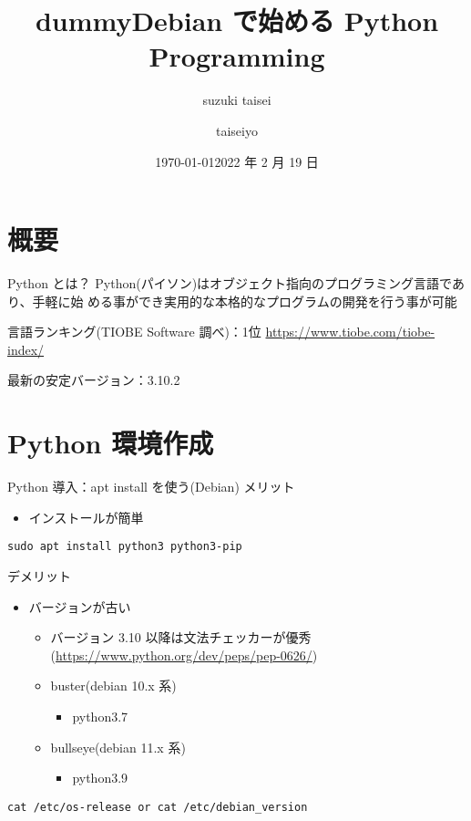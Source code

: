 \documentclass[compress,dvipdfmx,11pt]{beamer}
\author{suzuki taisei}
\date{\today}
\title{dummy}
\title[2022 年度 2 月 Debian 勉強会]{\bf Debian で始める Python Programming}
\author[]{taiseiyo}
\institute{Mail Address: taiseiyo11@gmail.com}
\date{2022 年 2 月 19 日}
\begin{document}
\maketitle
\newcommand{\pivec}{\mathbf \pi}
\newcommand{\xvec}{\mathbf x}
\newcommand{\yvec}{\mathbf y}
\newcommand{\zvec}{\mathbf z}
\newcommand{\Emat}{\mathbf E}
\newcommand{\Imat}{\mathbf I}

\section{概要}
\label{sec:org4880c8b}
\begin{frame}[label={sec:org89c1bda}]{Python とは？}
Python(パイソン)はオブジェクト指向のプログラミング言語であり、手軽に始
める事ができ実用的な本格的なプログラムの開発を行う事が可能

言語ランキング(TIOBE Software 調べ)：1位
\url{https://www.tiobe.com/tiobe-index/}

最新の安定バージョン：3.10.2
\end{frame}


\section{Python 環境作成}
\label{sec:org5623bdc}
\begin{frame}[label={sec:org61bc9a9},fragile]{Python 導入：apt install を使う(Debian)}
 メリット
\begin{itemize}
\item インストールが簡単
\end{itemize}
\begin{verbatim}
sudo apt install python3 python3-pip
\end{verbatim}

デメリット
\begin{itemize}
\item バージョンが古い
\begin{itemize}
\item バージョン 3.10 以降は文法チェッカーが優秀(\url{https://www.python.org/dev/peps/pep-0626/})
\item buster(debian 10.x 系)
\begin{itemize}
\item python3.7
\end{itemize}
\item bullseye(debian 11.x 系)
\begin{itemize}
\item python3.9
\end{itemize}
\end{itemize}
\end{itemize}

\vspace{-2truemm}      
\begin{verbatim}
cat /etc/os-release or cat /etc/debian_version
\end{verbatim}
\end{frame}
\end{document}
